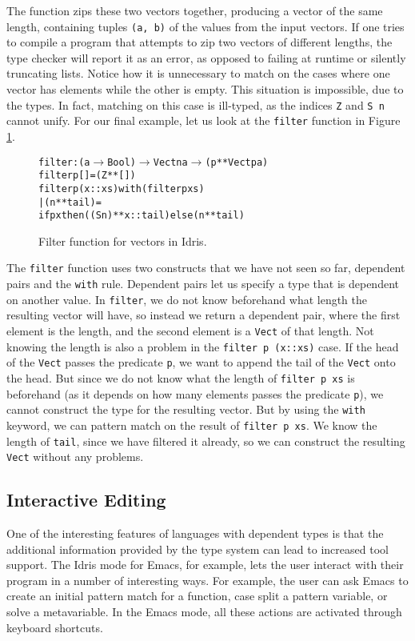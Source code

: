 The function zips these two vectors together, producing a vector of the same length, containing tuples \texttt{(a, b)} of the values from the input vectors. If one tries to compile a program that attempts to zip two vectors of different lengths, the type checker will report it as an error, as opposed to failing at runtime or silently truncating lists. Notice how it is unnecessary to match on the cases where one vector has elements while the other is empty. This situation is impossible, due to the types. In fact, matching on this case is ill-typed, as the indices \texttt{Z} and \texttt{S~n} cannot unify. For our final example, let us look at the \texttt{filter} function in Figure \ref{fig:filter}.

\begin{figure}
\begin{alltt}
filter : (a \(\to\) Bool) \(\to\) Vect n a \(\to\) (p ** Vect p a)
filter p [] = (Z ** [])
filter p (x::xs) with (filter p xs)
  | (n ** tail) =
    if p x then ((S n) ** x::tail) else (n ** tail)
\end{alltt}
\caption{Filter function for vectors in Idris.}
\label{fig:filter}
\end{figure}

The \texttt{filter} function uses two constructs that we have not seen so far, dependent pairs and the \texttt{with} rule. Dependent pairs let us specify a type that is dependent on another value. In \texttt{filter}, we do not know beforehand what length the resulting vector will have, so instead we return a dependent pair, where the first element is the length, and the second element is a \texttt{Vect} of that length. Not knowing the length is also a problem in the \texttt{filter p (x::xs)} case. If the head of the \texttt{Vect} passes the predicate \texttt{p}, we want to append the tail of the \texttt{Vect} onto the head. But since we do not know what the length of \texttt{filter p xs} is beforehand (as it depends on how many elements passes the predicate \texttt{p}), we cannot construct the type for the resulting vector. But by using the \texttt{with} keyword, we can pattern match on the result of \texttt{filter p xs}. We know the length of \texttt{tail}, since we have filtered it already, so we can construct the resulting \texttt{Vect} without any problems.

\subsection{Interactive Editing}
One of the interesting features of languages with dependent types is that the additional information provided by the type system can lead to increased tool support.
The Idris mode for Emacs, for example, lets the user interact with their program in a number of interesting ways.
For example, the user can ask Emacs to create an initial pattern match for a function, case split a pattern variable, or solve a metavariable.
In the Emacs mode, all these actions are activated through keyboard shortcuts.

